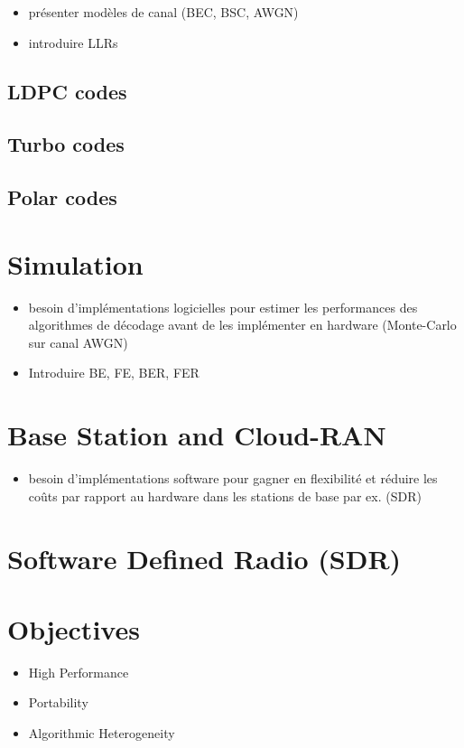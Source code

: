 \begin{itemize}
  \item présenter modèles de canal (BEC, BSC, AWGN)
  \item introduire LLRs
\end{itemize}

\subsection{LDPC codes}

\subsection{Turbo codes}

\subsection{Polar codes}

\section{Simulation}

\begin{itemize}
  \item besoin d'implémentations logicielles pour estimer les performances des
        algorithmes de décodage avant de les implémenter en hardware
        (Monte-Carlo sur canal AWGN)
  \item Introduire BE, FE, BER, FER
\end{itemize}

\section{Base Station and Cloud-RAN}

\begin{itemize}
  \item besoin d'implémentations software pour gagner en flexibilité et réduire
        les coûts par rapport au hardware dans les stations de base par ex.
        (SDR)
\end{itemize}

\section{Software Defined Radio (SDR)}

\section{Objectives}

\begin{itemize}
  \item High Performance
  \item Portability
  \item Algorithmic Heterogeneity
\end{itemize}
